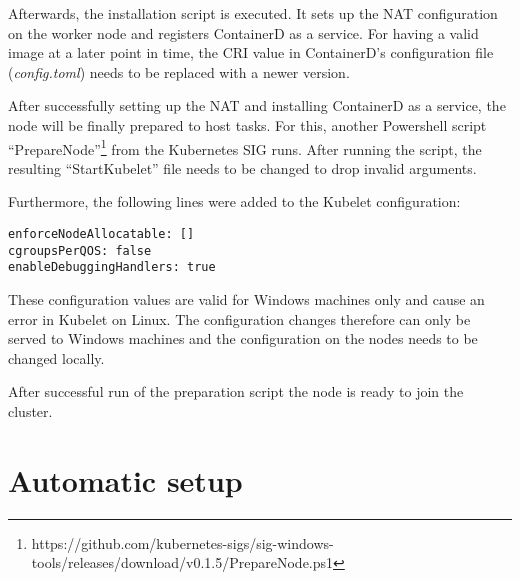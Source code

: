 Afterwards, the installation script is executed. It sets up the \ac{NAT} configuration on the worker node and registers ContainerD as a service.
For having a valid image at a later point in time, the \ac{CRI} value  in ContainerD's configuration file (\textit{config.toml}) needs to be replaced with a newer version.

After successfully setting up the \ac{NAT} and installing ContainerD as a service, the node will be finally prepared to host tasks. For this, another Powershell script \enquote{PrepareNode}\footnote{https://github.com/kubernetes-sigs/sig-windows-tools/releases/download/v0.1.5/PrepareNode.ps1} from the Kubernetes \ac{SIG} runs. After running the script, the resulting \enquote{StartKubelet} file needs to be changed to drop invalid arguments.

Furthermore, the following lines were added to the Kubelet configuration:
\begin{lstlisting}[label=lst:master.configtoml_changes, caption={Configuration changes in ContainerD configuration file (\textit{config.toml})\cite{GitHubKubernetesSIGWindowsTools.20230213}}]
enforceNodeAllocatable: []
cgroupsPerQOS: false
enableDebuggingHandlers: true
\end{lstlisting}
These configuration values are valid for \ac{Windows} machines only and cause an error in Kubelet on Linux. The configuration changes therefore can only be served to Windows machines and the configuration on the nodes needs to be changed locally.


After successful run of the preparation script the node is ready to join the cluster.


\section{Automatic setup}



